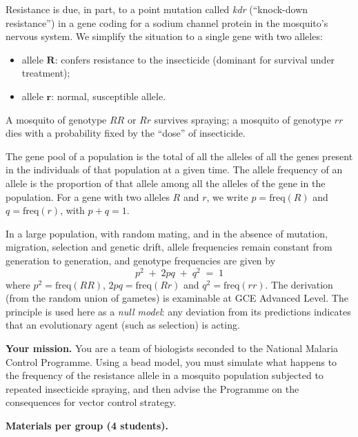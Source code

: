 \documentclass[11pt]{article}
\newcommand{\cle}[1]{{\popxbold\color{popdark}#1}}
\begin{document}
Resistance is due, in part, to a point mutation called \emph{kdr} (``knock-down resistance'') in a gene coding for a sodium channel protein in the mosquito's nervous system. We simplify the situation to a single gene with two alleles:

\begin{itemize}
\item allele $\mathbf{R}$: confers resistance to the insecticide (dominant for survival under treatment);
\item allele $\mathbf{r}$: normal, susceptible allele.
\end{itemize}

A mosquito of genotype $RR$ or $Rr$ survives spraying; a mosquito of genotype $rr$ dies with a probability fixed by the ``dose'' of insecticide.

\begin{definition}
The \cle{gene pool} of a population is the total of all the alleles of all the genes present in the individuals of that population at a given time. The \cle{allele frequency} of an allele is the proportion of that allele among all the alleles of the gene in the population. For a gene with two alleles $R$ and $r$, we write $p = \mathrm{freq}(R)$ and $q = \mathrm{freq}(r)$, with $p + q = 1$.
\end{definition}

\begin{propriete}
In a large population, with random mating, and in the absence of mutation, migration, selection and genetic drift, allele frequencies remain constant from generation to generation, and genotype frequencies are given by
\[
p^2 \;+\; 2pq \;+\; q^2 \;=\; 1
\]
where $p^2 = \mathrm{freq}(RR)$, $2pq = \mathrm{freq}(Rr)$ and $q^2 = \mathrm{freq}(rr)$. The derivation (from the random union of gametes) is examinable at GCE Advanced Level. The principle is used here as a \emph{null model}: any deviation from its predictions indicates that an evolutionary agent (such as selection) is acting.
\end{propriete}

\textbf{Your mission.} You are a team of biologists seconded to the National Malaria Control Programme. Using a bead model, you must simulate what happens to the frequency of the resistance allele in a mosquito population subjected to repeated insecticide spraying, and then advise the Programme on the consequences for vector control strategy.

\textbf{Materials per group (4 students).}
\end{document}
